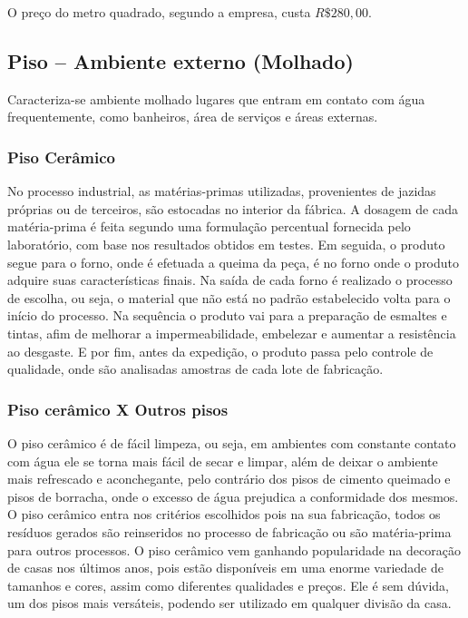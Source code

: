 	O preço do metro quadrado, segundo a empresa, custa $R\$ 280,00$.


\subsection{Piso – Ambiente externo (Molhado)}

        Caracteriza-se ambiente molhado lugares que entram em contato com água frequentemente, como banheiros, área de serviços e áreas externas.

\subsubsection*{\textbf{Piso Cerâmico}}

	No processo industrial, as matérias-primas utilizadas, provenientes de jazidas próprias ou de terceiros, são estocadas no interior da fábrica. A dosagem de cada matéria-prima é feita segundo uma formulação percentual fornecida pelo laboratório, com base nos resultados obtidos em testes. Em seguida, o produto segue para o forno, onde é efetuada a queima da peça, é no forno onde o produto adquire suas características finais. Na saída de cada forno é realizado o processo de escolha, ou seja, o material que não está no padrão estabelecido volta para o início do processo. Na sequência o produto vai para a preparação de esmaltes e tintas, afim de melhorar a impermeabilidade, embelezar e aumentar a resistência ao desgaste. E por fim, antes da expedição, o produto passa pelo controle de qualidade, onde são analisadas amostras de cada lote de fabricação.\cite{pisoCeramico}

\subsubsection*{\textbf{Piso cerâmico X Outros pisos}}

O piso cerâmico é de fácil limpeza, ou seja, em ambientes com constante contato com água ele se torna mais fácil de secar e limpar, além de deixar o ambiente mais refrescado e aconchegante, pelo contrário dos pisos de cimento queimado e pisos de borracha, onde o excesso de água prejudica a conformidade dos mesmos. O piso cerâmico entra nos critérios escolhidos pois na sua fabricação, todos os resíduos gerados são reinseridos no processo de fabricação ou são matéria-prima para outros processos. O piso cerâmico vem  ganhando popularidade na decoração de casas nos últimos anos, pois estão disponíveis em uma enorme variedade de tamanhos e cores, assim como diferentes qualidades e preços. Ele é sem dúvida, um dos pisos mais versáteis, podendo ser utilizado em qualquer divisão da casa.


